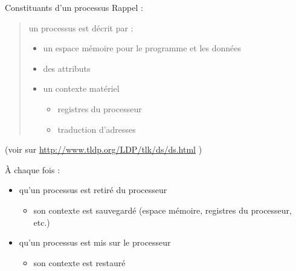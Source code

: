 \def\inc{inc2-2-ps}




\begin {frame} {Constituants d'un processus}
    Rappel :

    \begin {quote}
	un processus est décrit par :
	\begin {itemize}
	    \fB
	    \item un espace mémoire pour le programme et les données
	    \item des attributs
	    \item un contexte matériel
		\begin {itemize}
		    \fC
		    \item registres du processeur
		    \item traduction d'adresses
		\end {itemize}
	\end {itemize}
    \end {quote}

    { \fB (voir  sur
	\url {http://www.tldp.org/LDP/tlk/ds/ds.html} )}

    \vspace* {2mm}

    À chaque fois :
    \begin {itemize}
	\fB
	\item qu'un processus est retiré du processeur
	    \begin {itemize}
		\fC
		\item son contexte est sauvegardé (espace mémoire, registres
		    du processeur, etc.)
	    \end {itemize}
	\item qu'un processus est mis sur le processeur
	    \begin {itemize}
		\fC
		\item son contexte est restauré
	    \end {itemize}
    \end {itemize}
\end {frame}

